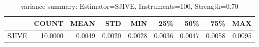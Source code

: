 \begin{table}[ht]
\centering
\caption{variance summary: Estimator=SJIVE, Instruments=100, Strength=0.70}
\begin{tabular}{lrrrrrrrr}
\toprule
 & COUNT & MEAN & STD & MIN & 25\% & 50\% & 75\% & MAX \\
\midrule
SJIVE & 10.0000 & 0.0049 & 0.0020 & 0.0028 & 0.0036 & 0.0047 & 0.0058 & 0.0095 \\
\bottomrule
\end{tabular}
\end{table}
